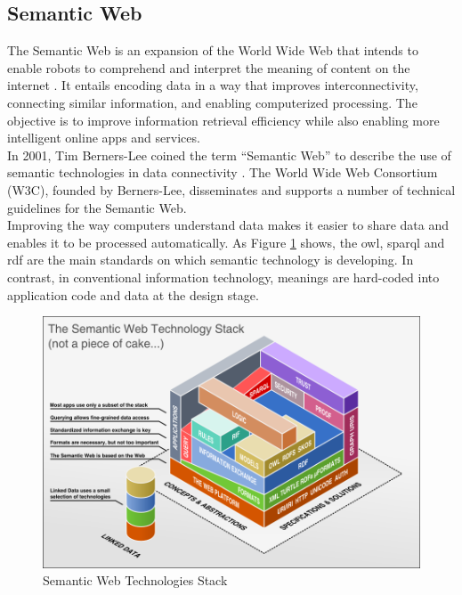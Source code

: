 \subsection{Semantic Web\label{sec:semweb}}
The Semantic Web is an expansion of the World Wide Web that intends to enable robots to comprehend and interpret the meaning of content on the internet \cite{shadbolt2006semantic, berners2023semantic, kim2003semantic}. It entails encoding data in a way that improves interconnectivity, connecting similar information, and enabling computerized processing. The objective is to improve information retrieval efficiency while also enabling more intelligent online apps and services.\\

In 2001, Tim Berners-Lee coined the term “Semantic Web” to describe the use of semantic technologies in data connectivity \cite{berners2023semantic}. The World Wide Web Consortium (W3C), founded by Berners-Lee, disseminates and supports a number of technical guidelines for the Semantic Web.\\

Improving the way computers understand data makes it easier to share data and enables it to be processed automatically. As Figure \ref{fig:sem-web-stack} shows, the \acrfull{owl}, \acrfull{sparql} and \acrfull{rdf} are the main standards on which semantic technology is developing. In contrast, in conventional information technology, meanings are hard-coded into application code and data at the design stage. \\

\begin{figure}[h]
    \centering
    \includegraphics[scale=0.6]{images/foundation-sem-web-tech-stack.png}
    \caption{\label{fig:sem-web-stack} Semantic Web Technologies Stack \cite{semWebStack} }
\end{figure}


